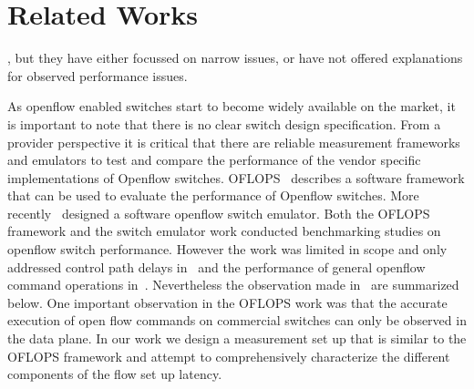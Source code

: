 \section{Related Works}
\label{sec:related}


, but they have either focussed on narrow issues, or have not offered explanations for observed performance issues. 

As openflow enabled switches start to become widely available on the market, it is important to note that there is no clear switch design specification. 
From a provider perspective it is critical that there are reliable measurement frameworks and emulators to test and compare the performance of the vendor specific implementations of Openflow switches. 
OFLOPS~\cite{oflops} describes a software framework that can be used to evaluate the performance of Openflow switches. 
More recently~\cite{ucsdpaper} designed a software openflow switch emulator. Both the OFLOPS framework and the switch emulator work conducted benchmarking 
studies on openflow switch performance. However the work was limited in scope and only addressed control path delays in~\cite{ucsdpaper} and 
the performance of general openflow command operations in~\cite{oflops}. Nevertheless the observation made in~\cite{ucsdpaper, oflops} are summarized below. 
One important observation in the OFLOPS work was that the accurate execution of open flow commands on commercial switches can only be observed in the data plane. 
In our work we design a measurement set up that is similar to the OFLOPS framework and attempt to comprehensively characterize the different components of the flow set up latency. 

